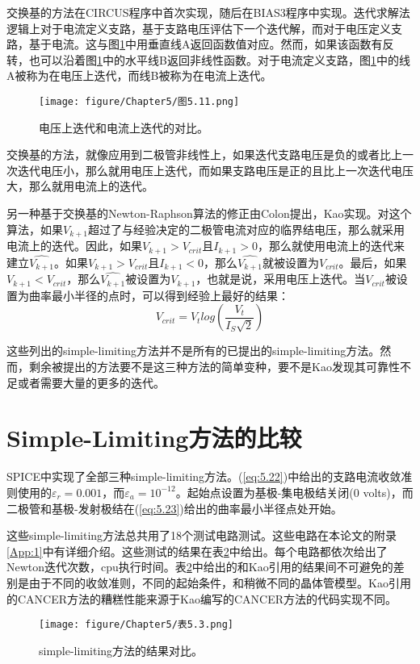 交换基的方法在CIRCUS程序\cite{ref-45}中首次实现，随后在BIAS3程序\cite{ref-59}中实现。迭代求解法逻辑上对于电流定义支路，基于支路电压评估下一个迭代解，而对于电压定义支路，基于电流。这与图\ref{图5.11}中用垂直线A返回函数值对应。然而，如果该函数有反转，也可以沿着图\ref{图5.11}中的水平线B返回非线性函数。对于电流定义支路，图\ref{图5.11}中的线A被称为在电压上迭代，而线B被称为在电流上迭代。
\begin{figure}[htbp]
\small
    \centering
    \texttt{[image: figure/Chapter5/图5.11.png]}
    \caption{电压上迭代和电流上迭代的对比。}
    \label{图5.11}
\end{figure}

交换基的方法，就像应用到二极管非线性上，如果迭代支路电压是负的或者比上一次迭代电压小，那么就用电压上迭代，而如果支路电压是正的且比上一次迭代电压大，那么就用电流上的迭代。

另一种基于交换基的Newton-Raphson算法的修正由Colon提出，Kao\cite{ref-58}实现。对这个算法，如果$V_{k+1}$超过了与经验决定的二极管电流对应的临界结电压，那么就采用电流上的迭代。因此，如果$V_{k+1} > V_{crit}$且$I_{k+1} > 0$，那么就使用电流上的迭代来建立$\hat{V_{k+1}}$。如果$V_{k+1}>V_{crit}$且$I_{k+1}<0$，那么$\hat{V_{k+1}}$就被设置为$V_{crit}$。最后，如果$V_{k+1}<V_{crit}$，那么$\hat{V_{k+1}}$被设置为$V_{k+1}$，也就是说，采用电压上迭代。当$V_{crit}$被设置为曲率最小半径的点时，可以得到经验上最好的结果：
\begin{equation}
    V_{crit} =V_tlog(\frac{V_t}{I_S\sqrt{2}})
    \label{eq:5.23}
\end{equation}

这些列出的simple-limiting方法并不是所有的已提出的simple-limiting方法。然而，剩余被提出的方法要不是这三种方法的简单变种，要不是Kao\cite{ref-58}发现其可靠性不足或者需要大量的更多的迭代。

\section{Simple-Limiting方法的比较}
SPICE中实现了全部三种simple-limiting方法。(\ref{eq:5.22})中给出的支路电流收敛准则使用的$\varepsilon_r = 0.001$，而$\varepsilon_a = 10^{-12}$。起始点设置为基极-集电极结关闭(0 volts)，而二极管和基极-发射极结在(\ref{eq:5.23})给出的曲率最小半径点处开始。

这些simple-limiting方法总共用了18个测试电路测试。这些电路在本论文的附录\ref{App:1}中有详细介绍。这些测试的结果在表\ref{表5.3}中给出。每个电路都依次给出了Newton迭代次数，cpu执行时间。表\ref{表5.3}中给出的和Kao引用的结果间不可避免的差别是由于不同的收敛准则，不同的起始条件，和稍微不同的晶体管模型。Kao引用的CANCER方法的糟糕性能来源于Kao编写的CANCER方法的代码实现不同。
\begin{figure}[htbp]
\small
    \centering
    \texttt{[image: figure/Chapter5/表5.3.png]}
    \caption{simple-limiting方法的结果对比。}
    \label{表5.3}
\end{figure}

